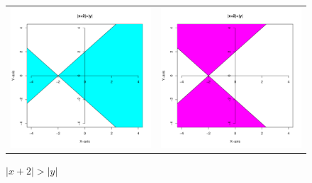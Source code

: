 \documentclass[12pt,b5paper]{ltjsarticle}
\begin{document}
\begin{enumerate}
\begin{figure}[h]
\begin{tabular}{cc}
\begin{minipage}[c]{200pt}
         \caption{$\lvert x-2 \rvert \leq \lvert y \rvert$}
         \label{f1-2}
        \end{minipage} \\ \hline
        \begin{minipage}[c]{200pt}
         \centering
         \includegraphics[scale=0.4]{dom_2_1.pdf}
         \caption{$\lvert x+2 \rvert > \lvert y \rvert$}
         \label{f2-1}
        \end{minipage} &
        \begin{minipage}[c]{200pt}
         \centering
         \includegraphics[scale=0.4]{dom_2_2.pdf}

\end{minipage}
\end{tabular}
\end{figure}
\end{enumerate}
\end{document}
